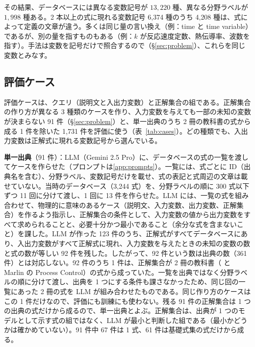 \documentclass[11pt,a4paper]{ltjsarticle}
\begin{document}
その結果、データベースには異なる変数記号が $13{,}220$ 種、異なる分野ラベルが $1{,}998$ 種ある。2 本以上の式に現れる変数記号 6{,}374 種のうち 4{,}208 種は、式によって定義の文章が違う。多くは同じ量の言い換え（例：time と time variable）であるが、別の量を指すものもある（例：$k$ が反応速度定数、熱伝導率、波数を指す）。手法は変数を記号だけで照合するので（\S\ref{sec:problem}）、これらを同じ変数とみなす。

\subsection{評価ケース}\label{sec:cases}
評価ケースは、クエリ（説明文と入出力変数）と正解集合の組である。正解集合の作り方が異なる 3 種類のケースを作り、入力変数を与えても一部の未知の変数が決まらない 91 件（\S\ref{sec:problem}）と、単一出典のうち 2 冊の教科書の式から成る 1 件を除いた 1{,}731 件を評価に使う（表~\ref{tab:cases}）。どの種類でも、入出力変数は正解式に現れる変数記号から選んでいる。

\textbf{単一出典}（91 件）：LLM（Gemini 2.5 Pro）に、データベースの式の一覧を渡してケースを作らせた（プロンプトは\ref{app:prompts}）。一覧には、式ごとに ID（出典名を含む）、分野ラベル、変数記号だけを載せ、式の表記と式周辺の文章は載せていない。当時のデータベース（3{,}244 式）を、分野ラベルの順に 300 式以下ずつ 11 回に分けて渡し、1 回に 13 件を作らせた。LLM には、一覧の式を組み合わせて、物理的に意味のあるケース（説明文、入力変数、出力変数、正解集合）を作るよう指示し、正解集合の条件として、入力変数の値から出力変数をすべて求められることと、必要十分かつ最小であること（余分な式を含まないこと）を課した。LLM が作った 123 件のうち、正解式がすべてデータベースにあり、入出力変数がすべて正解式に現れ、入力変数を与えたときの未知の変数の数と式の数が等しい 92 件を残した。したがって、92 件という数は出典の数（361 件）とは対応しない。92 件のうち 1 件は、正解集合が 2 冊の教科書（\citealp{Seborg} と Marlin の Process Control）の式から成っていた。一覧を出典ではなく分野ラベルの順に分けて渡し、出典を 1 つにする条件も課さなかったため、同じ回の一覧にあった 2 冊の式を LLM が組み合わせたものである。同じ作り方のケースはこの 1 件だけなので、評価にも訓練にも使わない。残る 91 件の正解集合は 1 つの出典の式だけから成るので、単一出典とよぶ。正解集合は、出典が 1 つのモデルとして示す式の組ではなく、LLM が最小と判断した組である（最小かどうかは確かめていない）。91 件中 67 件は 1 式、61 件は基礎式集の式だけから成る。
\end{document}
